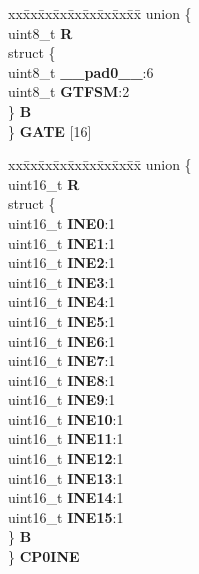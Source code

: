 \begin{DoxyCompactItemize}
\begin{tabbing}
\end{tabbing}\item 
\mbox{\label{structSEMA4__tag_a3f3a63c458691914543df50214cdd0dd}} 
\begin{tabbing}
xx\=xx\=xx\=xx\=xx\=xx\=xx\=xx\=xx\=\kill
union \{\\
\>uint8\_t {\bfseries R}\\
\>struct \{\\
\>\>uint8\_t {\bfseries \_\_pad0\_\_}:6\\
\>\>uint8\_t {\bfseries GTFSM}:2\\
\>\} {\bfseries B}\\
\} {\bfseries GATE} \mbox{[}16\mbox{]}\\

\end{tabbing}\item 
\mbox{\label{structSEMA4__tag_a409f2976675323e9f73e3a914bdf499e}} 
\begin{tabbing}
xx\=xx\=xx\=xx\=xx\=xx\=xx\=xx\=xx\=\kill
union \{\\
\>uint16\_t {\bfseries R}\\
\>struct \{\\
\>\>uint16\_t {\bfseries INE0}:1\\
\>\>uint16\_t {\bfseries INE1}:1\\
\>\>uint16\_t {\bfseries INE2}:1\\
\>\>uint16\_t {\bfseries INE3}:1\\
\>\>uint16\_t {\bfseries INE4}:1\\
\>\>uint16\_t {\bfseries INE5}:1\\
\>\>uint16\_t {\bfseries INE6}:1\\
\>\>uint16\_t {\bfseries INE7}:1\\
\>\>uint16\_t {\bfseries INE8}:1\\
\>\>uint16\_t {\bfseries INE9}:1\\
\>\>uint16\_t {\bfseries INE10}:1\\
\>\>uint16\_t {\bfseries INE11}:1\\
\>\>uint16\_t {\bfseries INE12}:1\\
\>\>uint16\_t {\bfseries INE13}:1\\
\>\>uint16\_t {\bfseries INE14}:1\\
\>\>uint16\_t {\bfseries INE15}:1\\
\>\} {\bfseries B}\\
\} {\bfseries CP0INE}\\


\end{tabbing}
\end{DoxyCompactItemize}
